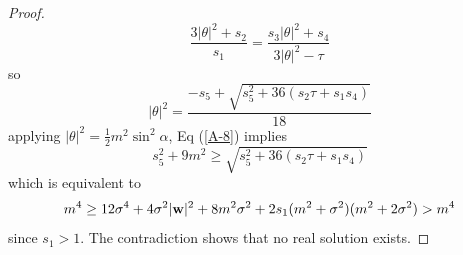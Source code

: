 \documentclass[10pt,reqno]{amsart}
\renewcommand{\(}{\left(}
\renewcommand{\)}{\right)}
\newcommand{\bw}{{\bf w}}
\numberwithin{equation}{section}
\begin{document}
\begin{proof}
\begin{equation}
	\frac{3 |\theta|^2 + s_2}{s_1} = \frac{s_3|\theta|^2 +s_4 }{3 |\theta|^2 -\tau}
\end{equation}
so
\begin{equation}\label{A-8}
|\theta|^2 = \frac{-s_5 + \sqrt{s_5^2 + 36(s_2\tau +s_1s_4)}}{18}
\end{equation}
applying $|\theta|^2= \frac12 m^2 \sin^2\alpha$, Eq (\ref{A-8}) implies
\[
s_5^2 + 9m^2 \ge \sqrt{s_5^2 + 36(s_2\tau +s_1s_4)}
\]
which is equivalent to
\begin{equation}
m^4 \ge 12 \sigma^4 + 4\sigma^2 |\bw|^2 + 8 m^2 \sigma^2 + 2s_1(m^2 + \sigma^2)(m^2 + 2\sigma^2) > m^4
\end{equation}
since $s_1>1$.  The contradiction shows that no real solution exists. 
\end{proof}
\end{document}
